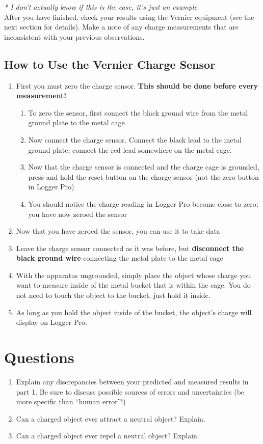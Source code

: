 \documentclass{article}
\begin{document}
{\scriptsize\textit{* I don't actually know if this is the case, it's just an example}}\\


After you have finished, check your results using the Vernier equipment (see the next section for details). Make a note of any charge measurements that are inconsistent with your previous observations.
\subsection*{How to Use the Vernier Charge Sensor}
\begin{enumerate}
	\item First you must zero the charge sensor. \textbf{This should be done before every measurement!}
	\begin{enumerate}
		\item To zero the sensor, first connect the black ground wire from the metal ground plate to the metal cage
		\item Now connect the charge sensor. Connect the black lead to the metal ground plate; connect the red lead somewhere on the metal cage.
		\item Now that the charge sensor is connected and the charge cage is grounded, press and hold the reset button on the charge sensor (not the zero button in Logger Pro)
		\item You should notice the charge reading in Logger Pro become close to zero; you have now zeroed the sensor
	\end{enumerate}
	\item Now that you have zeroed the sensor, you can use it to take data
	\item Leave the charge sensor connected as it was before, but \textbf{disconnect the black ground wire} connecting the metal plate to the metal cage
	\item With the apparatus ungrounded, simply place the object whose charge you want to measure inside of the metal bucket that is within the cage. You do not need to touch the object to the bucket, just hold it inside.
	\item As long as you hold the object inside of the bucket, the object's charge will display on Logger Pro.
\end{enumerate}

\section*{Questions}
\begin{enumerate}
	\item Explain any discrepancies between your predicted and measured results in part 1. Be sure to discuss possible sources of errors and uncertainties (be more specific than ``human error''!)
	\item Can a charged object ever attract a neutral object? Explain.
	\item Can a charged object ever repel a neutral object? Explain.
\end{enumerate}
\end{document}
